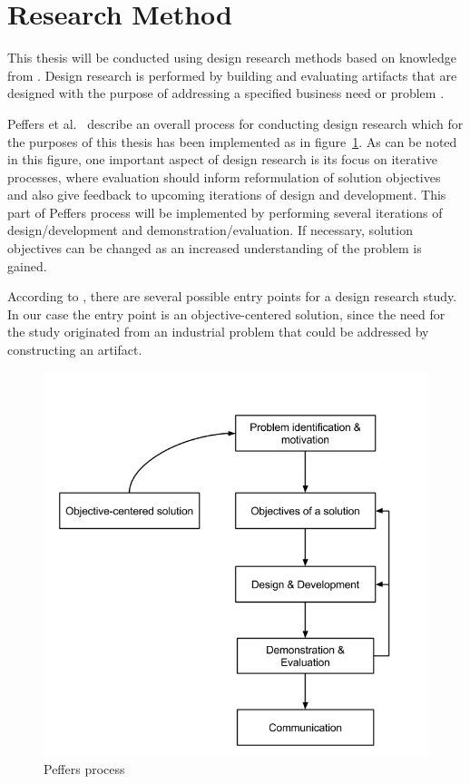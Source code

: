\section{Research Method}
This thesis will be conducted using design research methods based on knowledge from \cite{DS, Peffers, DesignEval}. Design research is performed by building and evaluating artifacts that are designed with the purpose of addressing a specified business need or problem \cite{DS}. 


Peffers et al.\ \cite{Peffers} describe an overall process for conducting design research which for the purposes of this thesis has been implemented as in figure~\ref{fig:peffer}. As can be noted in this figure, one important aspect of design research is its focus on iterative processes, where evaluation should inform reformulation of solution objectives and also give feedback to upcoming iterations of design and development. This part of Peffers process will be implemented by performing several iterations of design/development and demonstration/evaluation. If necessary, solution objectives can be changed as an increased understanding of the problem is gained. 

According to \cite{Peffers}, there are several possible entry points for a design research study. In our case the entry point is an objective-centered solution, since the need for the study originated from an industrial problem that could be addressed by constructing an artifact.
\begin{figure}[h!]
\centering
\includegraphics[width=0.7\pdfpagewidth]{figure/Peffer.png}
\caption{Peffers process}
\label{fig:peffer}
\end{figure}

